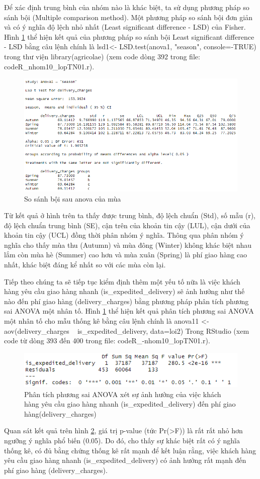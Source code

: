 Để xác định trung bình của nhóm nào là khác biệt, ta sử dụng phương pháp so sánh bội (Multiple comparison method). Một phương pháp so sánh bội đơn giản và có ý nghĩa độ lệch nhỏ nhất (Least significant difference - LSD) của Fisher. Hình \ref{fig:5.2} thể hiện kết quả của phương pháp so sánh bội Least significant difference - LSD bằng câu lệnh chính là lsd1<- LSD.test(anova1, "season", console=-TRUE) trong thư viện library(agricolae) (xem code dòng 392 trong file: codeR\_nhom10\_lopTN01.r).
\begin{figure}[!htbp]
    \centering
    \includegraphics[width=0.6\linewidth]{graphics/5.3.3.png}
    \caption{So sánh bội sau anova của mùa}
    \label{fig:5.2}
\end{figure}

Từ kết quả ở hình trên ta thấy được trung bình, độ lệch chuẩn (Std), số mẫu (r), độ lệch chuẩn trung bình (SE), cận trên của khoản tin cậy (LUL), cận dưới của khoản tin cậy (UCL) đồng thời phân nhóm ý nghĩa. Thông qua phân nhóm ý nghĩa cho thấy mùa thu (Autumn) và mùa đông (Winter) không khác biệt nhau lắm còn mùa hè (Summer) cao hơn và mùa xuân (Spring) là phí giao hàng cao nhất, khác biệt đáng kể nhất so với các mùa còn lại.

Tiếp theo chúng ta sẽ tiếp tục kiểm định thêm một yếu tố nữa là việc khách hàng yêu cầu giao hàng nhanh (is\_expedited\_delivery) sẽ ảnh hưởng như thế nào đến phí giao hàng (delivery\_charges) bằng phương pháp phân tích phương sai ANOVA một nhân tố. Hình \ref{fig:5.2} thể hiện kết quả phân tích phương sai ANOVA một nhân tố cho mẫu thống kê bằng câu lệnh chính là anova11 <- aov(delivery\_charges ~ is\_expedited\_delivery, data=loi2) Trong RStudio (xem code từ dòng 393 đến 400 trong file: codeR\_-nhom10\_lopTN01.r).
\begin{figure}[!htbp]
    \centering
    \includegraphics[width=0.6\linewidth]{graphics/5.3.2.png}
    \caption{Phân tích phương sai ANOVA xét sự ảnh hưởng của việc khách hàng yêu cầu giao hàng nhanh (is\_expedited\_delivery) đến phí giao hàng(delivery\_charges)}
    \label{fig:5.3}
\end{figure}
Quan sát kết quả trên hình \ref{fig:5.3}, giá trị p-value (tức Pr(>F)) là rất rất nhỏ hơn ngưỡng ý nghĩa phổ biến (0.05). Do đó, cho thấy sự khác biệt rất có ý nghĩa thống kê, có đủ bằng chứng thống kê rất mạnh để kết luận rằng, việc khách hàng yêu cầu giao hàng nhanh (is\_expedited\_delivery) có ảnh hưởng rất mạnh đến phí giao hàng (delivery\_charges).

